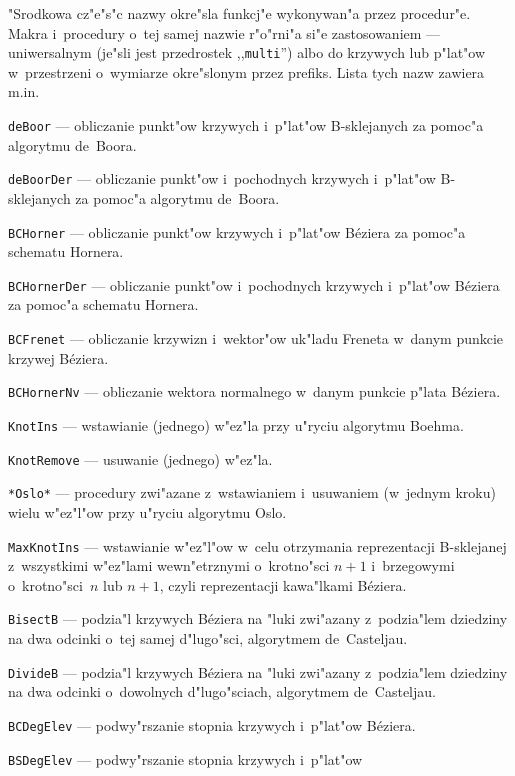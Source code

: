 "Srodkowa cz"e"s"c nazwy okre"sla funkcj"e wykonywan"a przez procedur"e.
Makra i~procedury o~tej samej nazwie r"o"rni"a si"e zastosowaniem ---
uniwersalnym (je"sli jest przedrostek ,,\texttt{multi}'') albo do krzywych
lub p"lat"ow w~przestrzeni o~wymiarze okre"slonym przez prefiks. Lista tych
nazw zawiera m.in.
\begin{mydescription}
  \item\texttt{deBoor} --- obliczanie punkt"ow krzywych i~p"lat"ow
    B-sklejanych za pomoc"a algorytmu de~Boora.
  \item\texttt{deBoorDer} --- obliczanie punkt"ow i~pochodnych
    krzywych i~p"lat"ow B-sklejanych za pomoc"a algorytmu de~Boora.
  \item\texttt{BCHorner} --- obliczanie punkt"ow krzywych i~p"lat"ow
    B\'{e}ziera za pomoc"a schematu Hornera.
  \item\texttt{BCHornerDer} --- obliczanie punkt"ow i~pochodnych
    krzywych i~p"lat"ow B\'{e}ziera za pomoc"a schematu Hornera.
  \item\texttt{BCFrenet} --- obliczanie krzywizn i~wektor"ow uk"ladu Freneta
    w~danym punkcie krzywej B\'{e}ziera.
  \item\texttt{BCHornerNv} --- obliczanie wektora normalnego w~danym punkcie
    p"lata B\'{e}ziera.
  \item\texttt{KnotIns} --- wstawianie (jednego) w"ez"la przy u"ryciu
    algorytmu Boehma.
  \item\texttt{KnotRemove} --- usuwanie (jednego) w"ez"la.
  \item\texttt{*Oslo*} --- procedury zwi"azane z~wstawianiem i~usuwaniem
    (w~jednym kroku) wielu w"ez"l"ow przy u"ryciu algorytmu Oslo.
  \item\texttt{MaxKnotIns} --- wstawianie w"ez"l"ow w~celu
    otrzymania reprezentacji \mbox{B-sklejanej} z~wszystkimi w"ez"lami
    wewn"etrznymi o~krotno"sci $n+1$ i~brzegowymi o~krotno"sci~$n$ lub
    $n+1$, czyli reprezentacji kawa"lkami B\'{e}ziera.
  \item\texttt{BisectB} --- podzia"l krzywych B\'{e}ziera na "luki
    zwi"azany z~podzia"lem dziedziny na dwa odcinki o~tej samej d"lugo"sci,
    algorytmem de~Casteljau.
  \item\texttt{DivideB} --- podzia"l krzywych B\'{e}ziera na "luki
    zwi"azany z~podzia"lem dziedziny na dwa odcinki o~dowolnych d"lugo"sciach,
    algorytmem de~Casteljau.
  \item\texttt{BCDegElev} --- podwy"rszanie stopnia krzywych i~p"lat"ow
    B\'{e}ziera.
  \item\texttt{BSDegElev} --- podwy"rszanie stopnia krzywych i~p"lat"ow

\end{mydescription}
